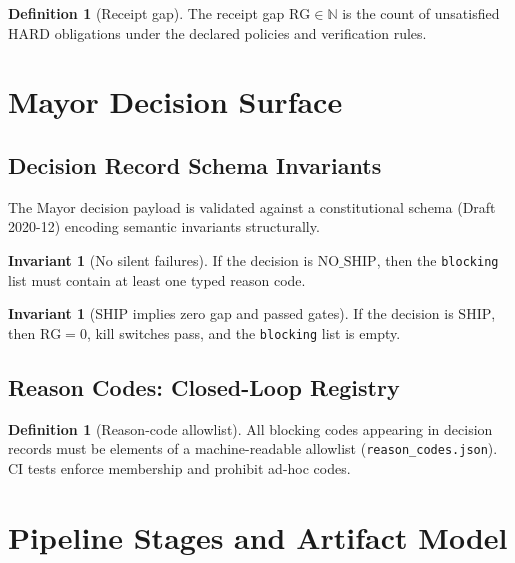 \documentclass[11pt,a4paper]{article}
\theoremstyle{plain}
\theoremstyle{definition}
\newtheorem{definition}[theorem]{Definition}
\newtheorem{invariant}[theorem]{Invariant}
\theoremstyle{remark}
\newcommand{\N}{\mathbb{N}}
\newcommand{\RG}{\mathrm{RG}}
\newcommand{\SHIP}{\mathrm{SHIP}}
\newcommand{\NOSHIP}{\mathrm{NO\_SHIP}}
\begin{document}
\begin{definition}[Receipt gap]
\label{def:receipt-gap}
The receipt gap \(\RG \in \N\) is the count of unsatisfied HARD obligations under the declared policies and verification rules.
\end{definition}

\section{Mayor Decision Surface}

\subsection{Decision Record Schema Invariants}
The Mayor decision payload is validated against a constitutional schema (Draft 2020-12) encoding semantic invariants structurally.

\begin{invariant}[No silent failures]
\label{inv:no-silent}
If the decision is \(\NOSHIP\), then the \texttt{blocking} list must contain at least one typed reason code.
\end{invariant}

\begin{invariant}[SHIP implies zero gap and passed gates]
\label{inv:ship-implies}
If the decision is \(\SHIP\), then \(\RG=0\), kill switches pass, and the \texttt{blocking} list is empty.
\end{invariant}

\subsection{Reason Codes: Closed-Loop Registry}
\begin{definition}[Reason-code allowlist]
All blocking codes appearing in decision records must be elements of a machine-readable allowlist (\texttt{reason\_codes.json}). CI tests enforce membership and prohibit ad-hoc codes.
\end{definition}

\section{Pipeline Stages and Artifact Model}
\end{document}
